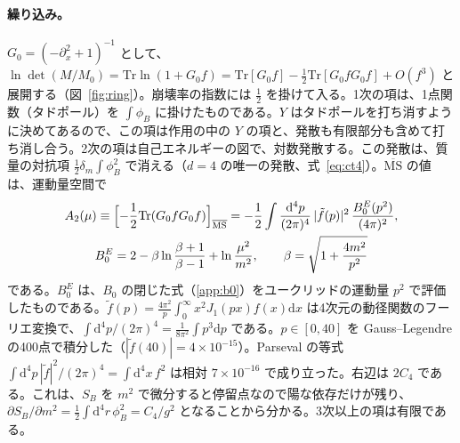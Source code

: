 \documentclass[a4paper,10pt]{ltjsarticle}
\newcommand{\dd}{\mathrm{d}}
\begin{document}
\paragraph{繰り込み。}$G_0=(-\partial_x^2+1)^{-1}$ として、$\ln\det(M/M_0)=\mathrm{Tr}\ln(1+G_0f)=\mathrm{Tr}[G_0f]-\frac12\mathrm{Tr}[G_0fG_0f]+O(f^3)$ と展開する（図~\ref{fig:ring}）。崩壊率の指数には $\frac12$ を掛けて入る。1次の項は、1点関数（タドポール）を $\int\phi_B$ に掛けたものである。$Y$ はタドポールを打ち消すように決めてあるので、この項は作用の中の $Y$ の項と、発散も有限部分も含めて打ち消し合う。2次の項は自己エネルギーの図で、対数発散する。この発散は、質量の対抗項 $\frac12\delta_m\int\phi_B^2$ で消える（$d=4$ の唯一の発散、式~\eqref{eq:ct4}）。$\overline{\mathrm{MS}}$ の値は、運動量空間で
\begin{gather*}
A_2(\mu)\equiv\Bigl[-\frac12\mathrm{Tr}(G_0fG_0f)\Bigr]_{\overline{\mathrm{MS}}}=-\frac12\int\frac{\dd^4p}{(2\pi)^4}\,|\tilde f(p)|^2\,\frac{B_0^E(p^2)}{(4\pi)^2},\\
B_0^E=2-\beta\ln\frac{\beta+1}{\beta-1}+\ln\frac{\mu^2}{m^2},\qquad\beta=\sqrt{1+\frac{4m^2}{p^2}}
\end{gather*}
である。$B_0^E$ は、$B_0$ の閉じた式（\ref{app:b0}）をユークリッドの運動量 $p^2$ で評価したものである。$\tilde f(p)=\frac{4\pi^2}{p}\int_0^\infty x^2J_1(px)f(x)\dd x$ は4次元の動径関数のフーリエ変換で、$\int\dd^4p/(2\pi)^4=\frac1{8\pi^2}\int p^3\dd p$ である。$p\in[0,40]$ を Gauss--Legendre の400点で積分した（$|\tilde f(40)|=4\times10^{-15}$）。Parseval の等式 $\int\dd^4p\,|\tilde f|^2/(2\pi)^4=\int\dd^4x\,f^2$ は相対 $7\times10^{-16}$ で成り立った。右辺は $2C_4$ である。これは、$S_B$ を $m^2$ で微分すると停留点なので陽な依存だけが残り、$\partial S_B/\partial m^2=\frac12\int\dd^4r\,\phi_B^2=C_4/g^2$ となることから分かる。3次以上の項は有限である。
\end{document}
